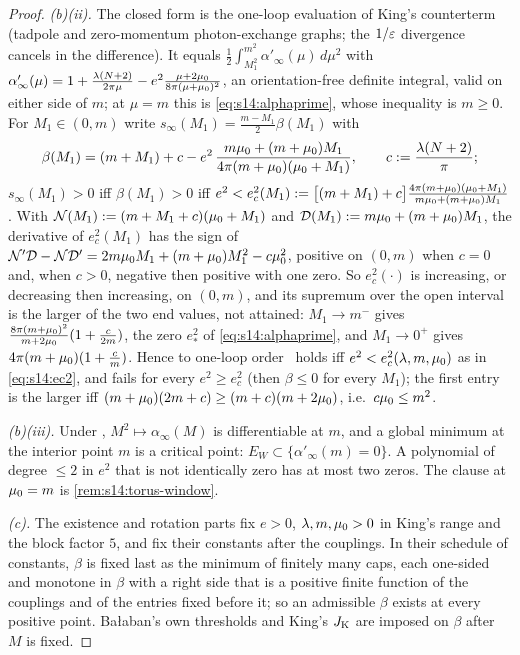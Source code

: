 \begin{proof}
\emph{(b)(ii).} The closed form is the one-loop evaluation of King's counterterm \cite[(3.32)--(3.33)]{K1} (tadpole and zero-momentum photon-exchange graphs; the $1/\varepsilon$ divergence cancels in the difference). It equals $\frac12\int_{M_1^2}^{m^2}\alpha'_\infty(\mu)\,d\mu^2$ with $\alpha'_\infty(\mu)=1+\frac{\lambda(N+2)}{2\pi\mu}-e^2\frac{\mu+2\mu_0}{8\pi(\mu+\mu_0)^2}$, an orientation-free definite integral, valid on either side of $m$; at $\mu=m$ this is \eqref{eq:s14:alphaprime}, whose inequality is $m\ge0$. For $M_1\in(0,m)$ write $s_\infty(M_1)=\frac{m-M_1}2\beta(M_1)$ with
\[
\beta(M_1)=(m+M_1)+c-e^2\,\frac{m\mu_0+(m+\mu_0)M_1}{4\pi(m+\mu_0)(\mu_0+M_1)},\qquad c:=\frac{\lambda(N+2)}{\pi};
\]
$s_\infty(M_1)>0$ iff $\beta(M_1)>0$ iff $e^2<e_c^2(M_1):=\big[(m+M_1)+c\big]\frac{4\pi(m+\mu_0)(\mu_0+M_1)}{m\mu_0+(m+\mu_0)M_1}$. With $\mathcal N(M_1):=(m+M_1+c)(\mu_0+M_1)$ and $\mathcal D(M_1):= m\mu_0+(m+\mu_0)M_1$, the derivative of $e_c^2(M_1)$ has the sign of $\mathcal N'\mathcal D-\mathcal N\mathcal D'=2m\mu_0 M_1+(m+\mu_0)M_1^2-c\mu_0^2$, positive on $(0,m)$ when $c=0$ and, when $c>0$, negative then positive with one zero. So $e_c^2(\cdot)$ is increasing, or decreasing then increasing, on $(0,m)$, and its supremum over the open interval is the larger of the two end values, not attained: $M_1\to m^-$ gives $\frac{8\pi(m+\mu_0)^2}{m+2\mu_0}(1+\frac c{2m})$, the zero $e_*^2$ of \eqref{eq:s14:alphaprime}, and $M_1\to0^+$ gives $4\pi(m+\mu_0)(1+\frac cm)$. Hence to one-loop order \Tthree\ holds iff $e^2<e_c^2(\lambda,m,\mu_0)$ as in \eqref{eq:s14:ec2}, and fails for every $e^2\ge e_c^2$ (then $\beta\le0$ for every $M_1$); the first entry is the larger iff $(m+\mu_0)(2m+c)\ge(m+c)(m+2\mu_0)$, i.e.\ $c\mu_0\le m^2$.

\emph{(b)(iii).} Under \sxivCT, $M^2\mapsto\alpha_\infty(M)$ is differentiable at $m$, and a global minimum at the interior point $m$ is a critical point: $E_W\subset\{\alpha'_\infty(m)=0\}$. A polynomial of degree $\le2$ in $e^2$ that is not identically zero has at most two zeros. The clause at $\mu_0=m$ is \cref{rem:s14:torus-window}.

\emph{(c).} The existence and rotation parts fix $e>0$, $\lambda,m,\mu_0>0$ in King's range and the block factor $5$, and fix their constants after the couplings. In their schedule of constants, $\beta$ is fixed last as the minimum of finitely many caps, each one-sided and monotone in $\beta$ with a right side that is a positive finite function of the couplings and of the entries fixed before it; so an admissible $\beta$ exists at every positive point. Ba{\l}aban's own thresholds and King's $J_{\rm K}$ are imposed on $\beta$ after $M$ is fixed.


\end{proof}
